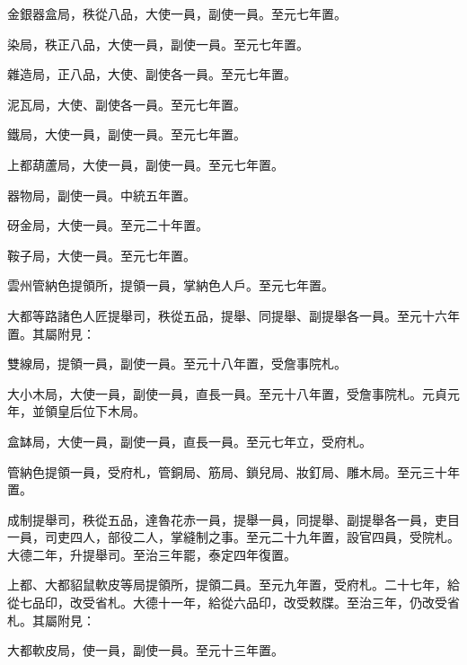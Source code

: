 \begin{pinyinscope}
 金銀器盒局，秩從八品，大使一員，副使一員。至元七年置。



 染局，秩正八品，大使一員，副使一員。至元七年置。



 雜造局，正八品，大使、副使各一員。至元七年置。



 泥瓦局，大使、副使各一員。至元七年置。



 鐵局，大使一員，副使一員。至元七年置。



 上都葫蘆局，大使一員，副使一員。至元七年置。



 器物局，副使一員。中統五年置。



 砑金局，大使一員。至元二十年置。



 鞍子局，大使一員。至元七年置。



 雲州管納色提領所，提領一員，掌納色人戶。至元七年置。



 大都等路諸色人匠提舉司，秩從五品，提舉、同提舉、副提舉各一員。至元十六年置。其屬附見：



 雙線局，提領一員，副使一員。至元十八年置，受詹事院札。



 大小木局，大使一員，副使一員，直長一員。至元十八年置，受詹事院札。元貞元年，並領皇后位下木局。



 盒缽局，大使一員，副使一員，直長一員。至元七年立，受府札。



 管納色提領一員，受府札，管銅局、筋局、鎖兒局、妝釘局、雕木局。至元三十年置。



 成制提舉司，秩從五品，達魯花赤一員，提舉一員，同提舉、副提舉各一員，吏目一員，司吏四人，部役二人，掌縫制之事。至元二十九年置，設官四員，受院札。大德二年，升提舉司。至治三年罷，泰定四年復置。



 上都、大都貂鼠軟皮等局提領所，提領二員。至元九年置，受府札。二十七年，給從七品印，改受省札。大德十一年，給從六品印，改受敕牒。至治三年，仍改受省札。其屬附見：



 大都軟皮局，使一員，副使一員。至元十三年置。




\end{pinyinscope}
